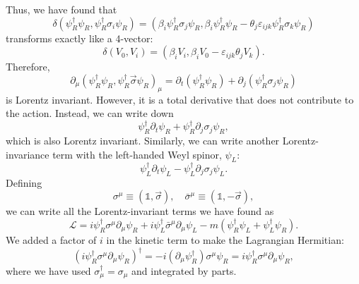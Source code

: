 \documentclass[11pt]{article}
\theoremstyle{definition}
\begin{document}
Thus, we have found that
\begin{equation}
    \delta(\psi_R^\dagger\psi_R,\psi_R^\dagger\sigma_i\psi_R) = (\beta_i\psi_R^\dagger\sigma_j\psi_R, \beta_i \psi_R^\dagger\psi_R - \theta_j\varepsilon_{ijk}\psi_R^\dagger\sigma_k\psi_R)
\end{equation}
transforms exactly like a 4-vector:
\begin{equation}
    \delta(V_0, V_i) = (\beta_i V_i, \beta_i V_0 - \varepsilon_{ijk}\theta_j V_k).
\end{equation}
Therefore, 
\begin{equation}
    \partial_\mu (\psi_R^\dagger\psi_R,\psi_R^\dagger\vec{\sigma}\psi_R)_\mu = \partial_t(\psi_R^\dagger\psi_R) + \partial_j(\psi_R^\dagger\sigma_j\psi_R)
\end{equation}
is Lorentz invariant. However, it is a total derivative that does not contribute to the action. Instead, we can write down 
\begin{equation}
    \psi_R^\dagger\partial_t\psi_R + \psi_R^\dagger\partial_j\sigma_j\psi_R,
\end{equation}
which is also Lorentz invariant.
Similarly, we can write another Lorentz-invariance term with the left-handed Weyl spinor, $\psi_L$:
\begin{equation}
    \psi_L^\dagger\partial_t\psi_L - \psi_L^\dagger\partial_j\sigma_j\psi_L.
\end{equation}
Defining
\begin{equation}
\sigma^{\mu} \equiv (\mathds{1}, \vec{\sigma}), \quad \bar{\sigma}^{\mu} \equiv (\mathds{1}, -\vec{\sigma}),
\end{equation}
we can write all the Lorentz-invariant terms we have found as
\begin{equation}
\mathcal{L} = i\psi_{R}^{\dagger}\sigma^{\mu}\partial_{\mu}\psi_{R} + i\psi_{L}^{\dagger}\bar{\sigma}^{\mu}\partial_{\mu}\psi_{L} - m(\psi_{R}^{\dagger}\psi_{L} + \psi_{L}^{\dagger}\psi_{R}).
\end{equation}
We added a factor of \(i\) in the kinetic term to make the Lagrangian Hermitian:
\begin{equation}
(i\psi_{R}^{\dagger}\sigma^{\mu}\partial_{\mu}\psi_{R})^{\dagger} = -i(\partial_{\mu}\psi_{R}^{\dagger})\sigma^{\mu}\psi_{R} = i\psi_{R}^{\dagger}\sigma^{\mu}\partial_{\mu}\psi_{R},
\end{equation}
where we have used \(\sigma_{\mu}^{\dagger} = \sigma_{\mu}\) and integrated by parts.
\end{document}
